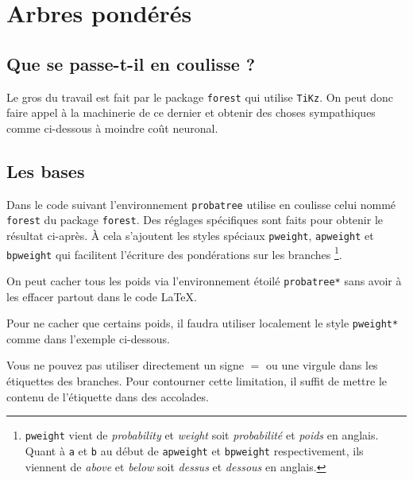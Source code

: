 \documentclass[12pt,a4paper]{article}
\begin{document}
\section{Arbres pondérés}

\subsection{Que se passe-t-il en coulisse ?}

Le gros du travail est fait par le package \verb+forest+ qui utilise \verb+TiKz+. On peut donc faire appel à la machinerie de ce dernier et obtenir des choses sympathiques comme ci-dessous à moindre coût neuronal.





\subsection{Les bases}


Dans le code suivant l'environnement \verb+probatree+ utilise en coulisse celui nommé \verb+forest+ du package \verb+forest+. Des réglages spécifiques sont faits pour obtenir le résultat ci-après.
À cela s'ajoutent les styles spéciaux \verb+pweight+, \verb+apweight+ et \verb+bpweight+ qui facilitent l'écriture des pondérations sur les branches
\footnote{
    \texttt{pweight} vient de \emph{\og probability \fg} et \emph{\og weight\fg} soit \emph{\og probabilité \fg} et \emph{\og poids\fg} en anglais.
    Quant à \texttt{a} et \texttt{b} au début de \texttt{apweight} et \texttt{bpweight} respectivement, ils viennent de \emph{\og above \fg} et \emph{\og below\fg} soit \emph{\og dessus \fg} et \emph{\og dessous\fg} en anglais.
}.






On peut cacher tous les poids via l'environnement étoilé \verb+probatree*+ sans avoir à les effacer partout dans le code \LaTeX.






Pour ne cacher que certains poids, il faudra utiliser localement le style \verb+pweight*+ comme dans l'exemple ci-dessous.






Vous ne pouvez pas utiliser directement un signe $=$ ou une virgule dans les étiquettes des branches.
Pour contourner cette limitation, il suffit de mettre le contenu de l'étiquette dans des accolades.

\end{document}
